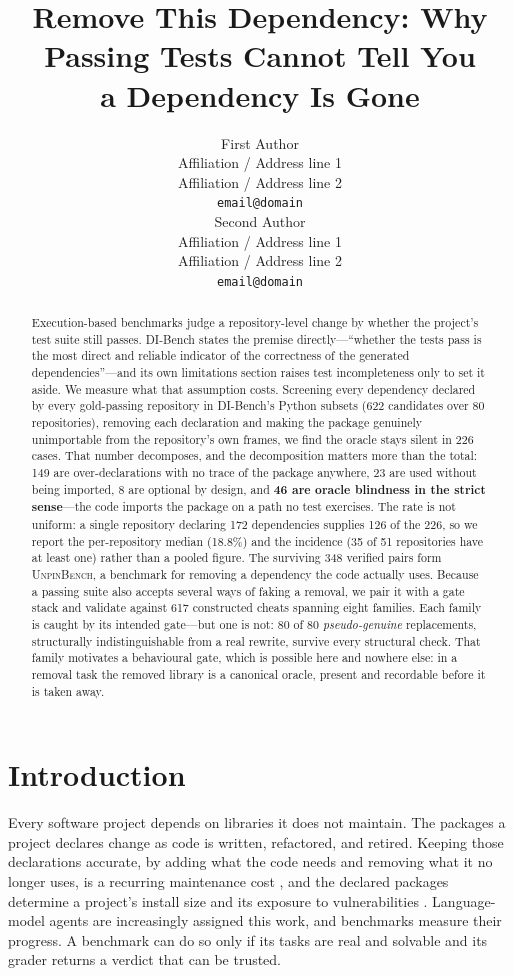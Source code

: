 \documentclass[11pt]{article}
\title{Remove This Dependency: Why Passing Tests Cannot Tell You\\
a Dependency Is Gone}
\author{First Author \\
  Affiliation / Address line 1 \\
  Affiliation / Address line 2 \\
  \texttt{email@domain} \\\And
  Second Author \\
  Affiliation / Address line 1 \\
  Affiliation / Address line 2 \\
  \texttt{email@domain} \\}
\newcommand{\bench}{\textsc{UnpinBench}}
\newcommand{\dibench}{DI-Bench}
\begin{document}
\maketitle

\begin{abstract}
Execution-based benchmarks judge a repository-level change by whether the project's test suite still passes.
\dibench{} \citep{dibench2025} states the premise directly---``whether the tests pass is the most direct and reliable indicator of the correctness of the generated dependencies''---and its own limitations section raises test incompleteness only to set it aside.
We measure what that assumption costs.
Screening every dependency declared by every gold-passing repository in \dibench's Python subsets (622 candidates over 80 repositories), removing each declaration and making the package genuinely unimportable from the repository's own frames, we find the oracle stays silent in 226 cases.
That number decomposes, and the decomposition matters more than the total: 149 are over-declarations with no trace of the package anywhere, 23 are used without being imported, 8 are optional by design, and \textbf{46 are oracle blindness in the strict sense}---the code imports the package on a path no test exercises.
The rate is not uniform: a single repository declaring 172 dependencies supplies 126 of the 226, so we report the per-repository median (18.8\%) and the incidence (35 of 51 repositories have at least one) rather than a pooled figure.
The surviving 348 verified pairs form \bench, a benchmark for removing a dependency the code actually uses.
Because a passing suite also accepts several ways of faking a removal, we pair it with a gate stack and validate against 617 constructed cheats spanning eight families.
Each family is caught by its intended gate---but one is not: 80 of 80 \emph{pseudo-genuine} replacements, structurally indistinguishable from a real rewrite, survive every structural check.
That family motivates a behavioural gate, which is possible here and nowhere else: in a removal task the removed library is a canonical oracle, present and recordable before it is taken away.
\end{abstract}

\section{Introduction}
\label{sec:intro}

Every software project depends on libraries it does not maintain.
The packages a project declares change as code is written, refactored, and retired.
Keeping those declarations accurate, by adding what the code needs and removing what it no longer uses, is a recurring maintenance cost \citep{mcintosh2011build}, and the declared packages determine a project's install size and its exposure to vulnerabilities \citep{drosos2024bloat}.
Language-model agents are increasingly assigned this work, and benchmarks measure their progress.
A benchmark can do so only if its tasks are real and solvable and its grader returns a verdict that can be trusted.
\end{document}
